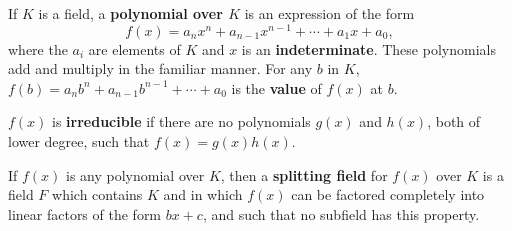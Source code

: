 If $K$ is a field, a \textbf{polynomial over $K$} is an expression of the form
$$f(x) = a_n x^n + a_{n-1} x^{n-1} + \cdots + a_1 x + a_0,$$
where the $a_i$ are elements of $K$ and $x$ is an \textbf{indeterminate}. These polynomials add and multiply in the familiar manner. For any $b$ in $K$, $f(b) = a_n b^n + a_{n-1} b^{n-1} + \cdots + a_0$ is the \textbf{value} of $f(x)$ at $b$.

$f(x)$ is \textbf{irreducible} if there are no polynomials $g(x)$ and $h(x)$, both of lower degree, such that $f(x) = g(x)h(x)$.

If $f(x)$ is any polynomial over $K$, then a \textbf{splitting field} for $f(x)$ over $K$ is a field $F$ which contains $K$ and in which $f(x)$ can be factored completely into linear factors of the form $bx + c$, and such that no subfield has this property.
